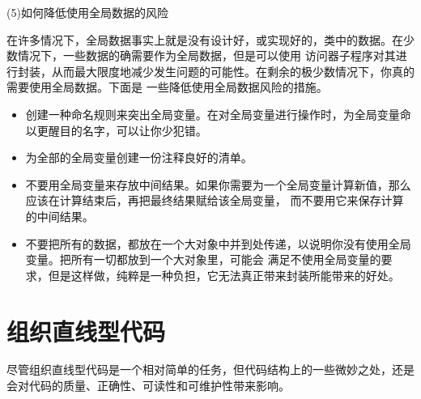 \documentclass{article}
\begin{document}
\par
(5)如何降低使用全局数据的风险
\par
在许多情况下，全局数据事实上就是没有设计好，或实现好的，类中的数据。在少数情况下，一些数据的确需要作为全局数据，但是可以使用
访问器子程序对其进行封装，从而最大限度地减少发生问题的可能性。在剩余的极少数情况下，你真的需要使用全局数据。下面是
一些降低使用全局数据风险的措施。
\begin{itemize}
    \item 创建一种命名规则来突出全局变量。在对全局变量进行操作时，为全局变量命以更醒目的名字，可以让你少犯错。
    \item 为全部的全局变量创建一份注释良好的清单。
    \item 不要用全局变量来存放中间结果。如果你需要为一个全局变量计算新值，那么应该在计算结束后，再把最终结果赋给该全局变量，
    而不要用它来保存计算的中间结果。
    \item 不要把所有的数据，都放在一个大对象中并到处传递，以说明你没有使用全局变量。把所有一切都放到一个大对象里，可能会
    满足不使用全局变量的要求，但是这样做，纯粹是一种负担，它无法真正带来封装所能带来的好处。
\end{itemize}

\section{组织直线型代码}
尽管组织直线型代码是一个相对简单的任务，但代码结构上的一些微妙之处，还是会对代码的质量、正确性、可读性和可维护性带来影响。
\end{document}
